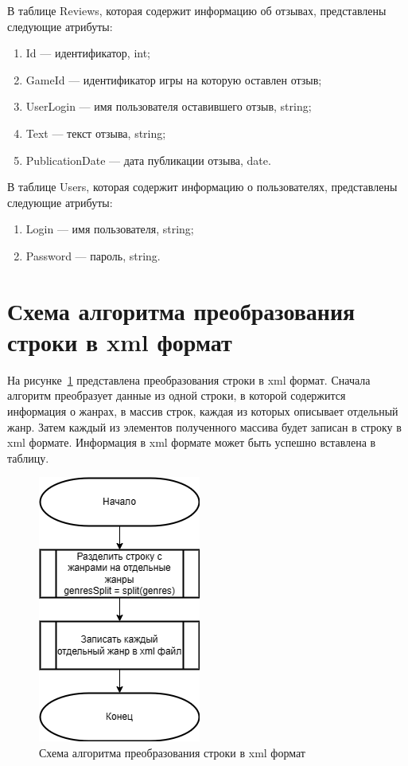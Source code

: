 В таблице Reviews, которая содержит информацию об отзывах, представлены следующие атрибуты:

\begin{enumerate}
	\item Id --- идентификатор, int;
	\item GameId --- идентификатор игры на которую оставлен отзыв;
	\item UserLogin --- имя пользователя оставившего отзыв, string;
	\item Text --- текст отзыва, string;
	\item PublicationDate --- дата публикации отзыва, date.
\end{enumerate}

В таблице Users, которая содержит информацию о пользователях, представлены следующие атрибуты:

\begin{enumerate}
	\item Login --- имя пользователя, string;
	\item Password --- пароль, string.
\end{enumerate}

\section{Схема алгоритма преобразования строки в xml формат}

На рисунке~\ref{fig:xmltransform} представлена преобразования строки в xml формат. Сначала алгоритм преобразует данные из одной строки, в которой содержится информация о жанрах, в массив строк, каждая из которых описывает отдельный жанр. Затем каждый из элементов полученного массива будет записан в строку в xml формате. Информация в xml формате может быть успешно вставлена в таблицу.

\begin{figure}[H]
	\centering
	\captionsetup{justification=centering}
	\includegraphics{../imgs/xmlTransform}
	\caption{Схема алгоритма преобразования строки в xml формат}
	\label{fig:xmltransform}
\end{figure}

